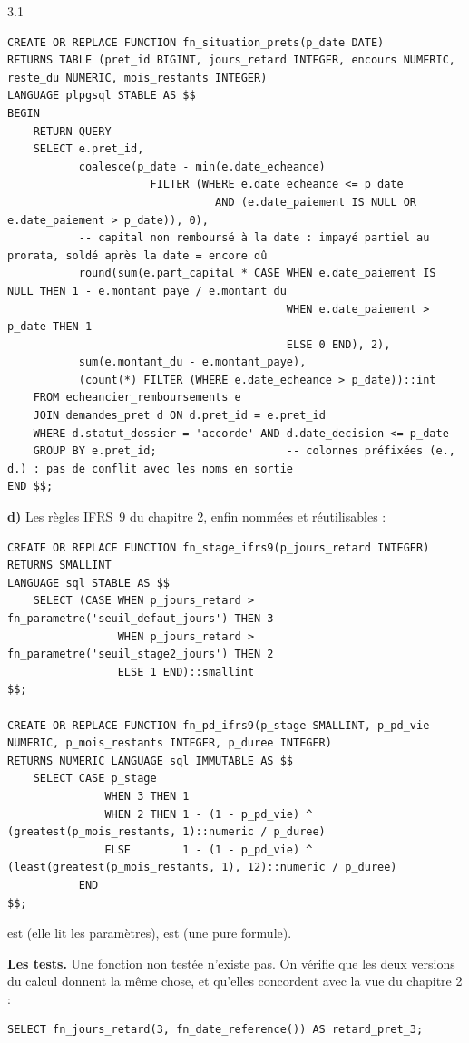 \begin{correction}{3.1}
\begin{lstlisting}[style=long]
CREATE OR REPLACE FUNCTION fn_situation_prets(p_date DATE)
RETURNS TABLE (pret_id BIGINT, jours_retard INTEGER, encours NUMERIC, reste_du NUMERIC, mois_restants INTEGER)
LANGUAGE plpgsql STABLE AS $$
BEGIN
    RETURN QUERY
    SELECT e.pret_id,
           coalesce(p_date - min(e.date_echeance)
                      FILTER (WHERE e.date_echeance <= p_date
                                AND (e.date_paiement IS NULL OR e.date_paiement > p_date)), 0),
           -- capital non remboursé à la date : impayé partiel au prorata, soldé après la date = encore dû
           round(sum(e.part_capital * CASE WHEN e.date_paiement IS NULL THEN 1 - e.montant_paye / e.montant_du
                                           WHEN e.date_paiement > p_date THEN 1
                                           ELSE 0 END), 2),
           sum(e.montant_du - e.montant_paye),
           (count(*) FILTER (WHERE e.date_echeance > p_date))::int
    FROM echeancier_remboursements e
    JOIN demandes_pret d ON d.pret_id = e.pret_id
    WHERE d.statut_dossier = 'accorde' AND d.date_decision <= p_date
    GROUP BY e.pret_id;                    -- colonnes préfixées (e., d.) : pas de conflit avec les noms en sortie
END $$;
\end{lstlisting}

\textbf{d)} Les règles IFRS~9 du chapitre 2, enfin nommées et réutilisables :
\begin{lstlisting}[style=long]
CREATE OR REPLACE FUNCTION fn_stage_ifrs9(p_jours_retard INTEGER) RETURNS SMALLINT
LANGUAGE sql STABLE AS $$
    SELECT (CASE WHEN p_jours_retard > fn_parametre('seuil_defaut_jours') THEN 3
                 WHEN p_jours_retard > fn_parametre('seuil_stage2_jours') THEN 2
                 ELSE 1 END)::smallint
$$;

CREATE OR REPLACE FUNCTION fn_pd_ifrs9(p_stage SMALLINT, p_pd_vie NUMERIC, p_mois_restants INTEGER, p_duree INTEGER)
RETURNS NUMERIC LANGUAGE sql IMMUTABLE AS $$
    SELECT CASE p_stage
               WHEN 3 THEN 1
               WHEN 2 THEN 1 - (1 - p_pd_vie) ^ (greatest(p_mois_restants, 1)::numeric / p_duree)
               ELSE        1 - (1 - p_pd_vie) ^ (least(greatest(p_mois_restants, 1), 12)::numeric / p_duree)
           END
$$;
\end{lstlisting}
 est  (elle lit les paramètres),  est
 (une pure formule).

\textbf{Les tests.} Une fonction non testée n'existe pas. On vérifie que les deux versions du calcul
donnent la même chose, et qu'elles concordent avec la vue du chapitre 2 :
\begin{lstlisting}[style=long]
SELECT fn_jours_retard(3, fn_date_reference()) AS retard_pret_3;


\end{lstlisting}
\end{correction}
